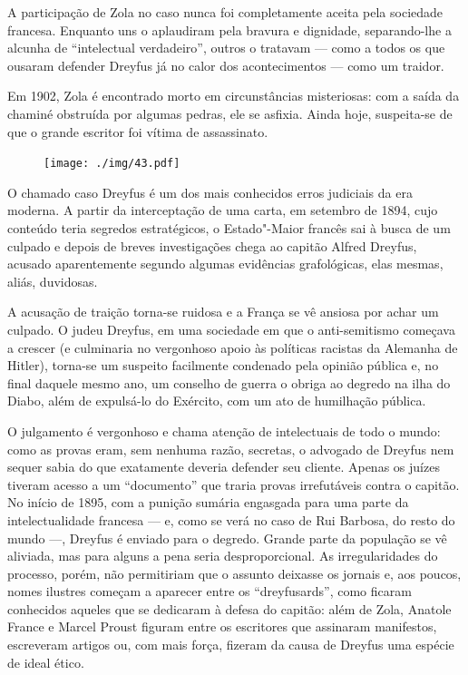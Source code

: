 A participação de Zola no caso nunca foi completamente aceita pela
sociedade francesa. Enquanto uns o aplaudiram pela bravura e dignidade,
separando-lhe a alcunha de “intelectual verdadeiro”, outros o
tratavam --- como a todos os que ousaram defender Dreyfus já no calor dos
acontecimentos --- como um traidor.

Em 1902, Zola é encontrado morto em circunstâncias misteriosas: com a
saída da chaminé obstruída por algumas pedras, ele se asfixia. Ainda
hoje, suspeita-se de que o grande escritor foi vítima de assassinato.
\asterisc

\begin{figure}
\centering
\texttt{[image: ./img/43.pdf]}
\ \\
\end{figure}

O chamado caso Dreyfus é um dos mais conhecidos erros
judiciais da era moderna. A partir da interceptação de uma carta, em
setembro de 1894, cujo conteúdo teria segredos estratégicos, o Estado"-Maior
francês sai à busca de um culpado e depois de breves investigações
chega ao capitão Alfred Dreyfus, acusado aparentemente segundo algumas
evidências grafológicas, elas mesmas, aliás, duvidosas.

 A acusação de traição torna-se ruidosa e a França se vê ansiosa por
achar um culpado. O judeu Dreyfus, em uma sociedade em que o
anti-semitismo começava a crescer (e culminaria no vergonhoso apoio
às políticas racistas da Alemanha de Hitler), torna-se um suspeito
facilmente condenado pela opinião pública e, no final daquele mesmo ano,
um conselho de guerra o obriga ao degredo na ilha do Diabo, além de
expulsá-lo do Exército, com um ato de humilhação pública. 

 O julgamento é vergonhoso e chama atenção de intelectuais de todo o
mundo: como as provas eram, sem nenhuma razão, secretas, o advogado de
Dreyfus nem sequer sabia do que exatamente deveria defender seu cliente.
Apenas os juízes tiveram acesso a um “documento” que traria provas
irrefutáveis contra o capitão. No início de 1895, com a punição sumária
engasgada para uma parte da intelectualidade francesa --- e, como se verá no
caso de Rui Barbosa, do resto do mundo ---, Dreyfus é enviado para o
degredo. Grande parte da população se vê aliviada, mas para alguns a
pena seria desproporcional. As irregularidades do processo, porém, não
permitiriam que o assunto deixasse os jornais e, aos poucos, nomes
ilustres começam a aparecer entre os “dreyfusards”, como ficaram
conhecidos aqueles que se dedicaram à defesa do capitão: além de Zola,
Anatole France e Marcel Proust figuram entre os escritores que
assinaram manifestos, escreveram artigos ou, com mais força, fizeram da
causa de Dreyfus uma espécie de ideal ético.

